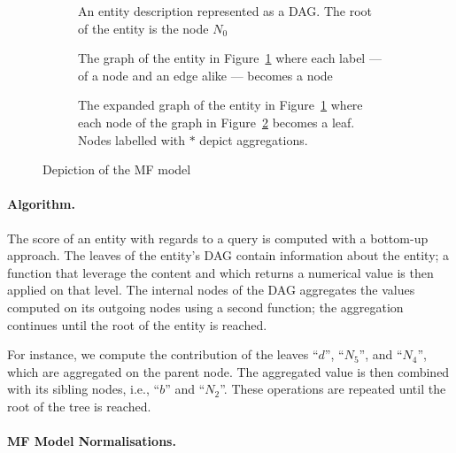 \begin{figure}
	\centering
	\begin{subfigure}{.3\textwidth}
		\centering
		\resizebox{\textwidth}{!}{
			
		}
		\caption{An entity description represented as a DAG. The root of the entity is the node $N_0$}
		\label{fig:concept-tree}
	\end{subfigure}
	\quad
	\begin{subfigure}{.3\textwidth}
		\centering
		\resizebox{\textwidth}{!}{
			
		}
		\caption{The graph of the entity in Figure~\ref{fig:concept-tree} where each label --- of a node and an edge alike --- becomes a node}
		\label{fig:expanded-graph1}
	\end{subfigure}
	\qquad
	\begin{subfigure}{.7\textwidth}
		\centering
		\resizebox{\textwidth}{!}{
			
		}
		\caption{The expanded graph of the entity in Figure~\ref{fig:concept-tree} where each node of the graph in Figure~\ref{fig:expanded-graph1} becomes a leaf. Nodes labelled with $*$ depict aggregations.}
		\label{fig:expanded-graph2}
	\end{subfigure}
	\caption{Depiction of the MF model}
\end{figure}

\paragraph{Algorithm.}

The score of an entity with regards to a query is computed with a bottom-up approach. The leaves of the entity's DAG contain information about the entity; a function that leverage the content and which returns a numerical value is then applied on that level. The internal nodes of the DAG aggregates the values computed on its outgoing nodes using a second function; the aggregation continues until the root of the entity is reached.

For instance, we compute the contribution of the leaves ``$d$'', ``$N_5$'', and ``$N_4$'', which are aggregated on the parent node. The aggregated value is then combined with its sibling nodes, i.e., ``$b$'' and ``$N_2$''. These operations are repeated until the root of the tree is reached.

\paragraph{MF Model Normalisations.}
\label{chap:tree-ranking:mf-model:norm}

